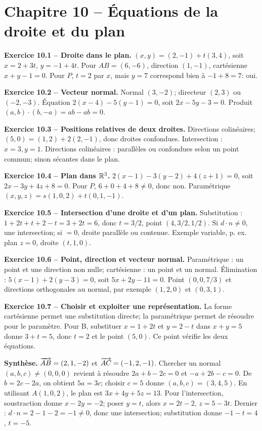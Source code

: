 \chapter*{Chapitre 10 -- Équations de la droite et du plan}
\begin{answerbox}
\textbf{Exercice 10.1 -- Droite dans le plan.} $(x,y)=(2,-1)+t(3,4)$, soit $x=2+3t$, $y=-1+4t$. Pour $AB=(6,-6)$, direction $(1,-1)$, cartésienne $x+y-1=0$. Pour $P$, $t=2$ par $x$, mais $y=7$ correspond bien à $-1+8=7$: oui.\par
\textbf{Exercice 10.2 -- Vecteur normal.} Normal $(3,-2)$; directeur $(2,3)$ ou $(-2,-3)$. Équation $2(x-4)-5(y-1)=0$, soit $2x-5y-3=0$. Produit $(a,b)\cdot(b,-a)=ab-ab=0$.\par
\textbf{Exercice 10.3 -- Positions relatives de deux droites.} Directions colinéaires; $(5,0)=(1,2)+2(2,-1)$, donc droites confondues. Intersection : $x=3,y=1$. Directions colinéaires : parallèles ou confondues selon un point commun; sinon sécantes dans le plan.\par
\textbf{Exercice 10.4 -- Plan dans \texorpdfstring{$\mathbb{R}^3$}{R3}.} $2(x-1)-3(y-2)+4(z+1)=0$, soit $2x-3y+4z+8=0$. Pour $P$, $6+0+4+8\neq0$, donc non. Paramétrique $(x,y,z)=s(1,0,2)+t(0,1,-1)$.\par
\textbf{Exercice 10.5 -- Intersection d'une droite et d'un plan.} Substitution : $1+2t+t+2-t=3+2t=6$, donc $t=3/2$, point $(4,3/2,1/2)$. Si $d\cdot n\neq0$, une intersection; si $=0$, droite parallèle ou contenue. Exemple variable, p. ex. plan $z=0$, droite $(t,1,0)$.\par
\textbf{Exercice 10.6 -- Point, direction et vecteur normal.} Paramétrique : un point et une direction non nulle; cartésienne : un point et un normal. Élimination : $5(x-1)+2(y-3)=0$, soit $5x+2y-11=0$. Point $(0,0,7/3)$ et directions orthogonales au normal, par exemple $(1,2,0)$ et $(0,3,1)$.\par
\textbf{Exercice 10.7 -- Choisir et exploiter une représentation.} La forme cartésienne permet une substitution directe; la paramétrique permet de résoudre pour le paramètre. Pour B, substituer $x=1+2t$ et $y=2-t$ dans $x+y=5$ donne $3+t=5$, donc $t=2$ et le point $(5,0)$. Ce point vérifie les deux équations.\par
\medskip\textbf{Synthèse.} $\overrightarrow{AB}=(2,1,-2)$ et $\overrightarrow{AC}=(-1,2,-1)$. Chercher un normal $(a,b,c)\neq(0,0,0)$ revient à résoudre $2a+b-2c=0$ et $-a+2b-c=0$. De $b=2c-2a$, on obtient $5a=3c$; choisir $c=5$ donne $(a,b,c)=(3,4,5)$. En utilisant $A(1,0,2)$, le plan est $3x+4y+5z=13$. Pour l'intersection, soustraction donne $x-2y=-2$; poser $y=t$, alors $x=2t-2$, $z=5-3t$. Dernier : $d\cdot n=2-1-2=-1\neq0$, donc une intersection; substitution donne $-1-t=4$, $t=-5$.
\end{answerbox}
